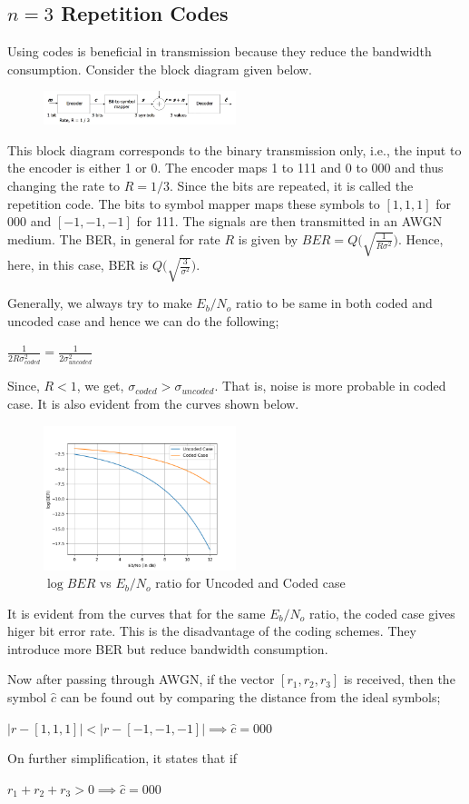 \documentclass[twocolumn]{report}
\begin{document}
\subsection{$n=3$ Repetition Codes}
Using codes is beneficial in transmission because they reduce the bandwidth consumption. Consider the block diagram given below.
\begin{figure}[H]
\includegraphics[width=0.5\textwidth, height=0.07\textheight]{repitioncode.png}
\end{figure}
This block diagram corresponds to the binary transmission only, i.e., the input to the encoder is either 1 or 0. The encoder maps 1 to 111 and 0 to 000 and thus changing the rate to $R=1/3$. Since the bits are repeated, it is called the repetition code. The bits to symbol mapper maps these symbols to $[1,1,1]$ for 000 and $[-1, -1, -1]$ for 111. The signals are then transmitted in an AWGN medium. The BER, in general for rate $R$ is given by $\displaystyle BER = Q\Bigg(\sqrt{\frac{1}{R\sigma^{2}}}\Bigg)$. Hence, here, in this case, BER is $\displaystyle Q\Bigg(\sqrt{\frac{3}{\sigma^{2}}}\Bigg)$.
\par Generally, we always try to make $E_{b}/N_{o}$ ratio to be same in both coded and uncoded case and hence we can do the following;
\begin{center}
$\displaystyle \frac{1}{2R\sigma_{coded}^{2}} = \frac{1}{2\sigma_{uncoded}^{2}}$
\end{center}
Since, $R<1$, we get, $\sigma_{coded} > \sigma_{uncoded}$. That is, noise is more probable in coded case. It is also evident from the curves shown below. 
\begin{figure}[H]
\includegraphics[width=0.5\textwidth, height=0.3\textheight]{codedvsuncoded.png}
\caption{$\log{BER}$ vs $E_{b}/N_{o}$ ratio for Uncoded and Coded case}
\end{figure}
It is evident from the curves that for the same $E_{b}/N_{o}$ ratio, the coded case gives higer bit error rate. This is the disadvantage of the coding schemes. They introduce more BER but reduce bandwidth consumption.
\par Now after passing through AWGN, if the vector $[r_{1}, r_{2}, r_{3}]$ is received, then the symbol $\hat{c}$ can be found out by comparing the distance from the ideal symbols;
\begin{center}
$|r - [1,1,1]| < |r-[-1,-1,-1]| \implies \hat{c} = 000$ 
\end{center}
On further simplification, it states that if
\begin{center}
$r_{1}+r_{2}+r_{3} > 0 \implies \hat{c} = 000$
\end{center}
\end{document}
